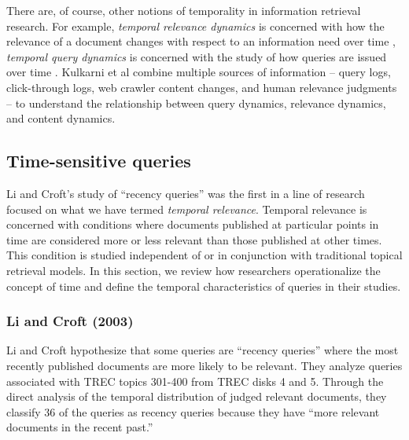 \documentclass{sig-alternate}
\begin{document}
There are, of course, other notions of temporality in information retrieval research.  For example, \emph{temporal relevance dynamics} is concerned with how the relevance of a document changes with respect to an information need over time \cite{Mizzaro1997},  \emph{temporal query dynamics} is concerned with the study of how queries are issued over time \cite{Shokouhi2011, Vlachos2005, Parikh2008, Lavrenko2000}.  Kulkarni et al \cite{Kulkarni2011} combine multiple sources of information -- query logs, click-through logs, web crawler content changes, and human relevance judgments -- to understand the relationship between query dynamics, relevance dynamics, and content dynamics. 

\subsection{Time-sensitive queries}
Li and Croft's study of ``recency queries'' was the first in a line of research focused on what we have termed \emph{temporal relevance}. Temporal relevance is concerned with conditions where documents published at particular points in time are considered more or less relevant than those published at other times. This condition is studied independent of or in conjunction with traditional topical retrieval models.  In this section, we review how researchers operationalize the concept of time and define the temporal characteristics of queries in their studies. 

\subsubsection{Li and Croft (2003)}
Li and Croft \cite{Li2003} hypothesize that some queries are ``recency queries'' where the most recently published documents are more likely to be relevant. They analyze queries associated with TREC topics 301-400 from TREC disks 4 and 5. Through the direct analysis of the temporal distribution of judged relevant documents, they classify 36 of the queries as recency queries because they have ``more relevant documents in the recent past.''
\end{document}
